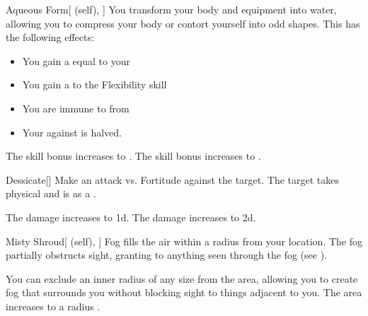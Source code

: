 \lowercase{\hypertarget{spell:Aqueous Form}{}}\label{spell:Aqueous Form}
\begin{attuneability}[Rank 4]{\hypertarget{spell:Aqueous Form}{Aqueous Form}}[ (self), ]
You transform your body and equipment into water, allowing you to compress your body or contort yourself into odd shapes.
This has the following effects:
\begin{itemize}
\item You gain a  equal to your 
\item You gain a   to the Flexibility skill
\item You are immune to  from 
\item Your  against  is halved.
\end{itemize}

\rankline
{} The skill bonus increases to .
 The skill bonus increases to .
\end{attuneability}
\vspace{0.25em}



\lowercase{\hypertarget{spell:Dessicate}{}}\label{spell:Dessicate}
\begin{freeability}[Rank 4]{\hypertarget{spell:Dessicate}{Dessicate}}[]
Make an attack vs. Fortitude against the target.
\hit The target takes physical  and is  as a .

\rankline
{} The damage increases to  \plus1d.
 The damage increases to  \plus2d.
\end{freeability}
\vspace{0.25em}



\lowercase{\hypertarget{spell:Misty Shroud}{}}\label{spell:Misty Shroud}
\begin{attuneability}[Rank 4]{\hypertarget{spell:Misty Shroud}{Misty Shroud}}[ (self), ]
\targetrule
Fog fills the air within a \areamed radius  from your location.
The fog partially obstructs sight, granting  to anything seen through the fog (see ).

\rankline
{} You can exclude an inner radius of any size from the area, allowing you to create fog that surrounds you without blocking sight to things adjacent to you.
 The area increases to a \arealarge radius .
\end{attuneability}
\vspace{0.25em}



